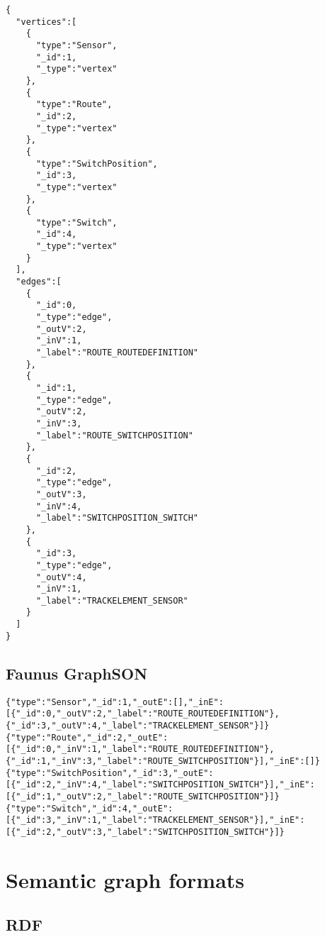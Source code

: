\lstset{language=json,firstnumber=1}
\begin{lstlisting}[caption=A graph based on the railway system metamodel stored in Blueprints \graphson{} format]
{
  "vertices":[
    {
      "type":"Sensor",
      "_id":1,
      "_type":"vertex"
    },
    {
      "type":"Route",
      "_id":2,
      "_type":"vertex"
    },
    {
      "type":"SwitchPosition",
      "_id":3,
      "_type":"vertex"
    },
    {
      "type":"Switch",
      "_id":4,
      "_type":"vertex"
    }
  ],
  "edges":[
    {
      "_id":0,
      "_type":"edge",
      "_outV":2,
      "_inV":1,
      "_label":"ROUTE_ROUTEDEFINITION"
    },
    {
      "_id":1,
      "_type":"edge",
      "_outV":2,
      "_inV":3,
      "_label":"ROUTE_SWITCHPOSITION"
    },
    {
      "_id":2,
      "_type":"edge",
      "_outV":3,
      "_inV":4,
      "_label":"SWITCHPOSITION_SWITCH"
    },
    {
      "_id":3,
      "_type":"edge",
      "_outV":4,
      "_inV":1,
      "_label":"TRACKELEMENT_SENSOR"
    }
  ]
}
\end{lstlisting}

\subsection{Faunus GraphSON}
\label{subsec:faunus-graphson}

\begin{lstlisting}[caption=A graph based on the railway system metamodel stored in Faunus \graphson{} format]
{"type":"Sensor","_id":1,"_outE":[],"_inE":[{"_id":0,"_outV":2,"_label":"ROUTE_ROUTEDEFINITION"},{"_id":3,"_outV":4,"_label":"TRACKELEMENT_SENSOR"}]}
{"type":"Route","_id":2,"_outE":[{"_id":0,"_inV":1,"_label":"ROUTE_ROUTEDEFINITION"},{"_id":1,"_inV":3,"_label":"ROUTE_SWITCHPOSITION"}],"_inE":[]}
{"type":"SwitchPosition","_id":3,"_outE":[{"_id":2,"_inV":4,"_label":"SWITCHPOSITION_SWITCH"}],"_inE":[{"_id":1,"_outV":2,"_label":"ROUTE_SWITCHPOSITION"}]}
{"type":"Switch","_id":4,"_outE":[{"_id":3,"_inV":1,"_label":"TRACKELEMENT_SENSOR"}],"_inE":[{"_id":2,"_outV":3,"_label":"SWITCHPOSITION_SWITCH"}]}
\end{lstlisting}

\section{Semantic graph formats}

\subsection{RDF}
\label{subsec:rdf}

